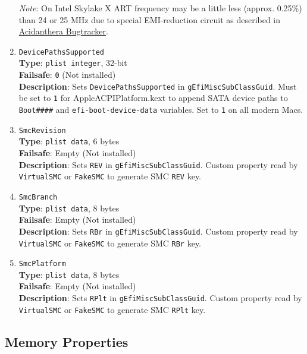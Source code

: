 \documentclass[]{article}
\makeatletter
\renewcommand{\label}[1]{%
\zref@wrapper@immediate{\oldlabel{#1}}}  %
\makeatother
\begin{document}
\begin{enumerate}
  \emph{Note}: On Intel Skylake X ART frequency may be a little less (approx. 0.25\%) than
  24 or 25 MHz due to special EMI-reduction circuit as described in
  \href{https://github.com/acidanthera/bugtracker/issues/448#issuecomment-524914166}{Acidanthera Bugtracker}.
\item
  \texttt{DevicePathsSupported}\\
  \textbf{Type}: \texttt{plist\ integer}, 32-bit\\
  \textbf{Failsafe}: \texttt{0} (Not installed)\\
  \textbf{Description}: Sets \texttt{DevicePathsSupported} in
  \texttt{gEfiMiscSubClassGuid}. Must be set to \texttt{1} for
  AppleACPIPlatform.kext to append SATA device paths to
  \texttt{Boot\#\#\#\#} and \texttt{efi-boot-device-data} variables.
  Set to \texttt{1} on all modern Macs.
\item
  \texttt{SmcRevision}\\
  \textbf{Type}: \texttt{plist\ data}, 6 bytes\\
  \textbf{Failsafe}: Empty (Not installed)\\
  \textbf{Description}: Sets \texttt{REV} in
  \texttt{gEfiMiscSubClassGuid}. Custom property read by
  \texttt{VirtualSMC} or \texttt{FakeSMC} to generate SMC \texttt{REV}
  key.
\item
  \texttt{SmcBranch}\\
  \textbf{Type}: \texttt{plist\ data}, 8 bytes\\
  \textbf{Failsafe}: Empty (Not installed)\\
  \textbf{Description}: Sets \texttt{RBr} in
  \texttt{gEfiMiscSubClassGuid}. Custom property read by
  \texttt{VirtualSMC} or \texttt{FakeSMC} to generate SMC \texttt{RBr}
  key.
\item
  \texttt{SmcPlatform}\\
  \textbf{Type}: \texttt{plist\ data}, 8 bytes\\
  \textbf{Failsafe}: Empty (Not installed)\\
  \textbf{Description}: Sets \texttt{RPlt} in
  \texttt{gEfiMiscSubClassGuid}. Custom property read by
  \texttt{VirtualSMC} or \texttt{FakeSMC} to generate SMC \texttt{RPlt}
  key.
\end{enumerate}

\subsection{Memory Properties}\label{platforminfomemory}
\end{document}
